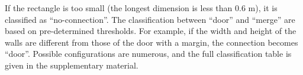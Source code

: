 %
If the rectangle is too small (the longest dimension is less than $0.6$
m), it is classified as ``no-connection''. The classification between
``door'' and ``merge'' are based on pre-determined thresholds. For
example, if the width and height of the walls are different from those
of the door with a margin, the connection becomes ``door''. Possible
configurations are numerous, and the full classification table is given
in the supplementary material.





